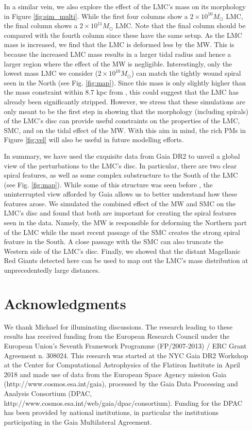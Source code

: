 \documentclass[a4paper,useAMS,usenatbib]{mnras}
\begin{document}
In a similar vein, we also explore the effect of the LMC's mass on its
morphology in Figure \ref{fig:sim_multi}. While the first four columns
show a $2\times 10^{10}M_\odot$ LMC, the final column shows a $2\times
10^{11} M_\odot$ LMC.  Note that the final column should be compared
with the fourth column since these have the same setup.  As the LMC
mass is increased, we find that the LMC is deformed less by the
MW. This is because the increased LMC mass results in a larger tidal
radius and hence a larger region where the effect of the MW is
negligible. Interestingly, only the lowest mass LMC we consider
($2\times 10^{10} M_\odot$) can match the tightly wound spiral seen in
the North (see Fig. \ref{fig:map}). Since this mass is only slightly
higher than the mass constraint within 8.7 kpc from
\cite{vandermarel_lmc}, this could suggest that the LMC has already
been significantly stripped. However, we stress that these simulations
are only meant to be the first step in showing that the morphology
(including spirals) of the LMC's disc can provide useful constraints
on the properties of the LMC, SMC, and on the tidal effect of the
MW. With this aim in mind, the rich PMs in Figure
\ref{fig:vel} will also be useful in future modelling efforts.

In summary, we have used the exquisite data from Gaia DR2 to
unveil a global view of the perturbations to the LMC's disc. In
particular, there are two clear spiral features, as well as some complex
substructure to the South of the LMC (see Fig. \ref{fig:map}). While
some of this structure was seen before
\citep[e.g.][]{Mackey2016,Mackey2018}, the uninterrupted view afforded
by Gaia allows us to better understand how these features
arose. We simulated the combined effect of the MW and SMC on
the LMC's disc and found that both are important for creating the
spiral features seen in the data. Namely, the MW is responsible
for deforming the Northern part of the LMC while the most recent
passage of the SMC creates the strong spiral feature in the South. A
close passage with the SMC can also truncate the Western side of the
LMC's disc. Finally, we showed that the distant Magellanic Red
Giants detected here can be used to map out the LMC's mass distribution at
unprecedentedly large distances.

\section*{Acknowledgments}

We thank Michael for illuminating discussions. The research leading to
these results has received funding from the European Research Council
under the European Union's Seventh Framework Programme (FP/2007-2013)
/ ERC Grant Agreement n. 308024. This research was started at the NYC
Gaia DR2 Workshop at the Center for Computational Astrophysics of the
Flatiron Institute in April 2018 and made use of data from the
European Space Agency mission Gaia (http://www.cosmos.esa.int/gaia),
processed by the Gaia Data Processing and Analysis Consortium (DPAC,
http://www.cosmos.esa.int/web/gaia/dpac/consortium). Funding for the
DPAC has been provided by national institutions, in particular the
institutions participating in the Gaia Multilateral Agreement.



\label{lastpage}
\end{document}

